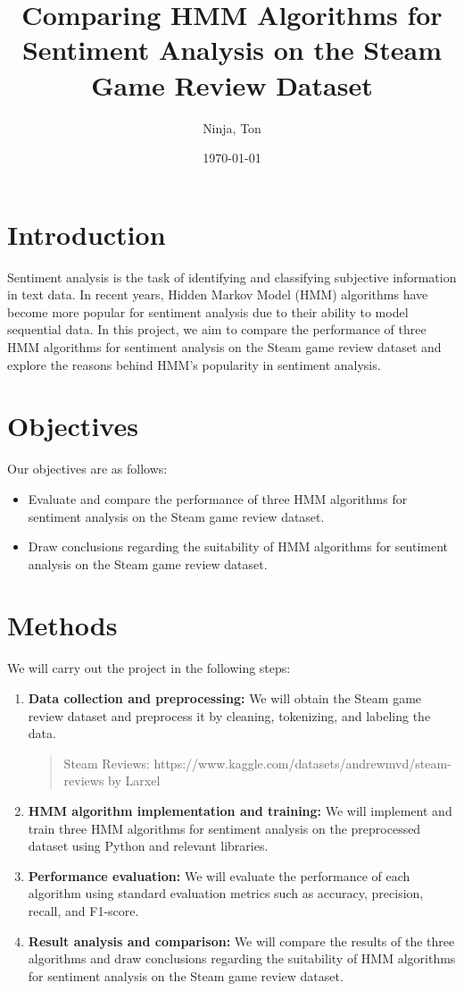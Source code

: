 \documentclass{article}
\title{Comparing HMM Algorithms for Sentiment Analysis on the Steam Game Review Dataset}
\author{Ninja, Ton}
\date{\today}
\begin{document}
\maketitle

\section{Introduction}
Sentiment analysis is the task of identifying and classifying subjective information in text data. In recent years, Hidden Markov Model (HMM) algorithms have become more popular for sentiment analysis due to their ability to model sequential data. In this project, we aim to compare the performance of three HMM algorithms for sentiment analysis on the Steam game review dataset and explore the reasons behind HMM's popularity in sentiment analysis.

\section{Objectives}
Our objectives are as follows:
\begin{itemize}
\item Evaluate and compare the performance of three HMM algorithms for sentiment analysis on the Steam game review dataset.
\item Draw conclusions regarding the suitability of HMM algorithms for sentiment analysis on the Steam game review dataset.
\end{itemize}

\section{Methods}
We will carry out the project in the following steps:
\begin{enumerate}
\item \textbf{Data collection and preprocessing:} We will obtain the Steam game review dataset and preprocess it by cleaning, tokenizing, and labeling the data.
\begin{quote}
Steam Reviews: https://www.kaggle.com/datasets/andrewmvd/steam-reviews by Larxel
\end{quote}
\item \textbf{HMM algorithm implementation and training:} We will implement and train three HMM algorithms for sentiment analysis on the preprocessed dataset using Python and relevant libraries.
\item \textbf{Performance evaluation:} We will evaluate the performance of each algorithm using standard evaluation metrics such as accuracy, precision, recall, and F1-score.
\item \textbf{Result analysis and comparison:} We will compare the results of the three algorithms and draw conclusions regarding the suitability of HMM algorithms for sentiment analysis on the Steam game review dataset.
\end{enumerate}
\end{document}
